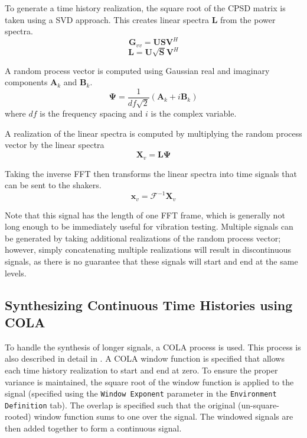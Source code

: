\documentclass[pdf,12pt,report]{SANDreport}
\newcommand{\inlineCode}{\lstinline[basicstyle=\bfseries\ttfamily]}
\begin{document}
    To generate a time history realization, the square root of the \ac{CPSD} matrix is taken using a \ac{SVD} approach.  This creates linear spectra $\mathbf{L}$ from the power spectra.
    \begin{equation}
        \mathbf{G}_{vv} = \mathbf{U}\mathbf{S}\mathbf{V}^H
    \end{equation}
    \begin{equation}
        \mathbf{L} = \mathbf{U}\sqrt{\mathbf{S}}\mathbf{V}^H
    \end{equation}

    A random process vector is computed using Gaussian real and imaginary components $\mathbf{A}_k$ and $\mathbf{B}_k$.
    \begin{equation}
        \mathbf{\Psi} = \frac{1}{{df}\sqrt{2}}(\mathbf{A}_k+i\mathbf{B}_k)
    \end{equation}
    where $df$ is the frequency spacing and $i$ is the complex variable.
    
    A realization of the linear spectra is computed by multiplying the random process vector by the linear spectra
    \begin{equation}
        \mathbf{X}_v = \mathbf{L}\mathbf{\Psi}
    \end{equation}

    Taking the inverse \ac{FFT} then transforms the linear spectra into time signals that can be sent to the shakers.
    \begin{equation}
        \mathbf{x}_v = \mathcal{F}^{-1}{\mathbf{X}_v}
    \end{equation}

    Note that this signal has the length of one \ac{FFT} frame, which is generally not long enough to be immediately useful for vibration testing.  Multiple signals can be generated by taking additional realizations of the random process vector; however, simply concatenating multiple realizations will result in discontinuous signals, as there is no guarantee that these signals will start and end at the same levels.
    
    \subsection{Synthesizing Continuous Time Histories using \ac{COLA}}
    To handle the synthesis of longer signals, a \ac{COLA} process is used.  This process is also described in detail in \cite{schultz2020_input_signal_synthesis_openloop_multipleinput_multipleoutput_testing}.  A \ac{COLA} window function is specified that allows each time history realization to start and end at zero.  To ensure the proper variance is maintained, the square root of the window function is applied to the signal (specified using the \inlineCode{Window Exponent} parameter in the \inlineCode{Environment Definition} tab).  The overlap is specified such that the original (un-square-rooted) window function sums to one over the signal.  The windowed signals are then added together to form a continuous signal.
    
\end{document}
